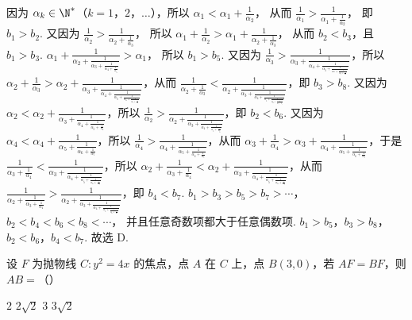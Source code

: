 \begin{solution}
因为 \(\alpha_k\in\N^*\)（\(k=1\)，\(2\)，\(\dots\)），所以
\(\alpha_1<\alpha_1+\frac{1}{\alpha_2}\)，
从而
\(\frac{1}{\alpha_1}>\frac{1}{\alpha_1+\frac{1}{\alpha_2}}\)，
即 \(b_1>b_2\).
又因为
\(\frac{1}{\alpha_2}>\frac{1}{\alpha_2+\frac{1}{\alpha_3}}\)，
所以
\(\alpha_1+\frac{1}{\alpha_2}>\alpha_1+\frac{1}{\alpha_2+\frac{1}{\alpha_3}}\)，
从而 \(b_2<b_3\)，且 \(b_1>b_3\).
\(\alpha_1+\frac{1}{\alpha_2+\frac{1}{\alpha_3+\frac{1}{\alpha_4+\frac{1}{\alpha_5}}}}>\alpha_1\)，
所以 \(b_1>b_5\).
又因为 \(\frac{1}{\alpha_3}>\frac{1}{\alpha_3+\frac{1}{\alpha_4+\frac{1}{\alpha_5+\frac{1}{\alpha_6+\frac{1}{\alpha_7+\frac{1}{\alpha_8}}}}}}\)，所以 \(\alpha_2+\frac{1}{\alpha_3}>\alpha_2+\frac{1}{\alpha_3+\frac{1}{\alpha_4+\frac{1}{\alpha_5+\frac{1}{\alpha_6+\frac{1}{\alpha_7+\frac{1}{\alpha_8}}}}}}\)，从而 \(\frac{1}{\alpha_2+\frac{1}{\alpha_3}}<\frac{1}{\alpha_2+\frac{1}{\alpha_3+\frac{1}{\alpha_4+\frac{1}{\alpha_5+\frac{1}{\alpha_6+\frac{1}{\alpha_7+\frac{1}{\alpha_8}}}}}}}\)，即 \(b_3>b_8\).
又因为 \(\alpha_2<\alpha_2+\frac{1}{\alpha_3+\frac{1}{\alpha_4+\frac{1}{\alpha_5+\frac{1}{\alpha_6}}}}\)，所以 \(\frac{1}{\alpha_2}>\frac{1}{\alpha_2+\frac{1}{\alpha_3+\frac{1}{\alpha_4+\frac{1}{\alpha_5+\frac{1}{\alpha_6}}}}}\)，即 \(b_2<b_6\).
又因为 \(\alpha_4< \alpha_4+\frac{1}{\alpha_5+\frac{1}{\alpha_6+\frac{1}{\alpha_7}}}\)，所以 \(\frac{1}{\alpha_4}>\frac{1}{\alpha_4+\frac{1}{\alpha_5+\frac{1}{\alpha_6+\frac{1}{\alpha_7}}}}\)，从而 \(\alpha_3+\frac{1}{\alpha_4}>\alpha_3+\frac{1}{\alpha_4+\frac{1}{\alpha_5+\frac{1}{\alpha_6+\frac{1}{\alpha_7}}}}\)，于是 \(\frac{1}{\alpha_3+\frac{1}{\alpha_4}}<\frac{1}{\alpha_3+\frac{1}{\alpha_4+\frac{1}{\alpha_5+\frac{1}{\alpha_6+\frac{1}{\alpha_7}}}}}\)，所以 \(\alpha_2+\frac{1}{\alpha_3+\frac{1}{\alpha_4}}<\alpha_2+\frac{1}{\alpha_3+\frac{1}{\alpha_4+\frac{1}{\alpha_5+\frac{1}{\alpha_6+\frac{1}{\alpha_7}}}}}\)，从而 \(\frac{1}{\alpha_2+\frac{1}{\alpha_3+\frac{1}{\alpha_4}}}>\frac{1}{\alpha_2+\frac{1}{\alpha_3+\frac{1}{\alpha_4+\frac{1}{\alpha_5+\frac{1}{\alpha_6+\frac{1}{\alpha_7}}}}}}\)，即 \(b_4<b_7\).
\(b_1>b_3>b_5>b_7>\cdots\)，
\(b_2<b_4<b_6<b_8<\cdots\)，
并且任意奇数项都大于任意偶数项.
\(b_1>b_5\)，\(b_3>b_8\)，\(b_2<b_6\)，\(b_4<b_7\).
故选 D.
\end{solution}

\begin{problem}
设 \(F\) 为抛物线 \(C:y^2=4x\) 的焦点，点 \(A\) 在 \(C\) 上，点 \(B(3,0)\)，若 \(AF=BF\)，则 \(AB=\)（\quad）

\choices
    {\(2\)}
    {\(2\sqrt{2}\)}
    {\(3\)}
    {\(3\sqrt{2}\)}
\end{problem}

